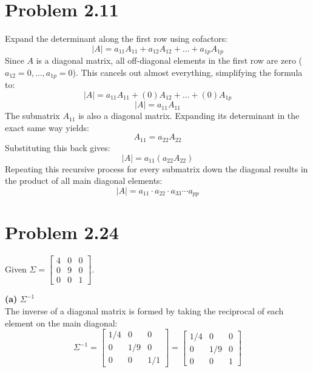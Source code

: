 \documentclass{article}
\begin{document}
\hrulefill

\section*{Problem 2.11}
Expand the determinant along the first row using cofactors:
\[
|A| = a_{11}A_{11} + a_{12}A_{12} + \dots + a_{1p}A_{1p}
\]
Since $A$ is a diagonal matrix, all off-diagonal elements in the first row are zero ($a_{12} = 0, \dots, a_{1p} = 0$). This cancels out almost everything, simplifying the formula to:
\[
|A| = a_{11}A_{11} + (0)A_{12} + \dots + (0)A_{1p}
\]
\[
|A| = a_{11}A_{11}
\]
The submatrix $A_{11}$ is also a diagonal matrix. Expanding its determinant in the exact same way yields:
\[
A_{11} = a_{22}A_{22}
\]
Substituting this back gives:
\[
|A| = a_{11}(a_{22}A_{22})
\]
Repeating this recursive process for every submatrix down the diagonal results in the product of all main diagonal elements:
\[
|A| = a_{11} \cdot a_{22} \cdot a_{33} \cdots a_{pp}
\]


\section*{Problem 2.24}
Given $\Sigma = \begin{bmatrix} 4 & 0 & 0 \\ 0 & 9 & 0 \\ 0 & 0 & 1 \end{bmatrix}$.

\noindent \textbf{(a)} $\Sigma^{-1}$ \\
The inverse of a diagonal matrix is formed by taking the reciprocal of each element on the main diagonal:
\[
\Sigma^{-1} = \begin{bmatrix} 1/4 & 0 & 0 \\ 0 & 1/9 & 0 \\ 0 & 0 & 1/1 \end{bmatrix} = \begin{bmatrix} 1/4 & 0 & 0 \\ 0 & 1/9 & 0 \\ 0 & 0 & 1 \end{bmatrix}
\]
\end{document}

